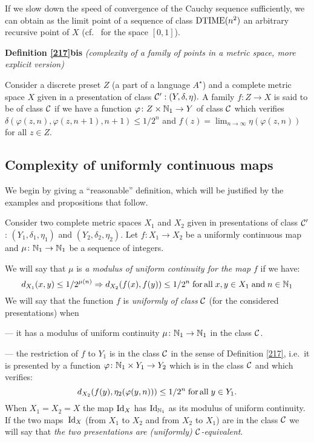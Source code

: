 \begin{remark} \label{2110}
If we slow down the speed of convergence of the Cauchy sequence sufficiently, we can obtain as the limit point of a sequence of class ${\rm DTIME} (n^2)$ an arbitrary recursive point of $X$ (cf.\ \cite{KF82} for the space $[0,1]$).
\end{remark} 

\mni
{\bf Definition \ref{217}bis }
{\em (complexity of a family of points in a metric space, more explicit version) }

\noindent 
Consider a discrete preset $Z$ (a part of a language $A^{\star}$) and a complete metric space $X$ given in a presentation of class ${{\cal C}}': (Y,\delta,\eta).$ 
A family $ f\colon Z \to X$ is said to be of class ${{\cal C}}$ if we have a function $ \varphi\colon Z \times \mathbb {N}_1 \to Y$ of class ${{\cal C}}$ which verifies
$
\delta(\varphi(z,n),\varphi(z,n+1),n+1) \leq 1/2^n 
$
and $f(z)=\lim_{n\to \infty}\eta(\varphi(z,n))$  for all  $z \in Z$.

\subsection{Complexity of uniformly continuous maps} \label{subsec22}

We begin by giving a ``reasonable'' definition, which will be justified by the examples and propositions that follow.

\begin{definition} \label{221}
Consider two complete metric spaces $X_1$ and $X_2$ given in presentations of class ${{\cal C}}'$: 
$(Y_1,\delta_1,\eta_1)$ and $(Y_2,\delta_2,\eta_2)$. 
Let $f\colon X_1 \to X_2$ be a uniformly continuous map and $\mu\colon \mathbb {N}_1 \to \mathbb {N}_1$ be a sequence of integers.

\noindent 
We will say that $\mu$ is {\em a modulus of uniform continuity for the map $f$} if we have: 
\[
d_{X_1}(x,y) \leq 1/2^{\mu(n)} \Rightarrow d_{X_2}(f(x),f(y)) \leq
1/2^n \;{\rm for\, all}\; x, y \in X_1 \;{\rm and}\; n \in \mathbb {N}_1
\]
We will say that the function $f$ is {\em uniformly of class} ${{\cal C}}$ (for the considered presentations) when

\noindent 
--- it has a modulus of uniform continuity $\mu\colon \mathbb {N}_1 \to \mathbb {N}_1$ in the class ${{\cal C}}$.

\noindent 
--- the restriction of $f$ to $Y_1$ is in the class ${{\cal C}}$ in the sense of Definition \ref{217}, i.e.\ it is presented by a function $\varphi\colon\mathbb {N}_1 \times Y_1 \to Y_2 $ which is in the class ${{\cal C}}$ and which verifies:
\[
d_{X_2}(f(y),\eta_2(\varphi(y,n))) \leq 1/2^n \; {\rm for\, all}\;  y \in 
Y_1.
\]	
When $X_1 = X_2 =X$ the map ${\rm Id}_X$ has ${\rm Id}_{\mathbb {N}_1}$ as its modulus of uniform continuity. If the two maps~${\rm Id}_X$ (from $X_1$ to $X_2$ and from $X_2$ to $X_1$) are in the class ${{\cal C}}$ we will say that {\em the two presentations are (uniformly) ${{\cal C}}$-equivalent}.
\end{definition}

